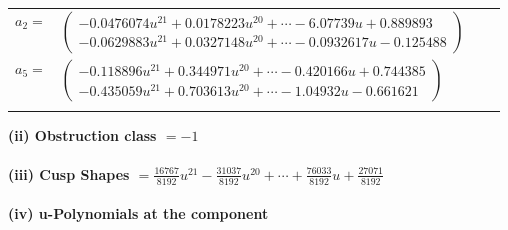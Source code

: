 \documentclass[1p]{elsarticle_modified}
\theoremstyle{definition}
\begin{document}
\begin{tabular}{m{7pt} m{180pt} m{7pt} m{180pt} }
\flushright $a_{2}=$&$\begin{pmatrix}-0.0476074 u^{21}+0.0178223 u^{20}+\cdots-6.07739 u+0.889893\\-0.0629883 u^{21}+0.0327148 u^{20}+\cdots-0.0932617 u-0.125488\end{pmatrix}$ \\
\flushright $a_{5}=$&$\begin{pmatrix}-0.118896 u^{21}+0.344971 u^{20}+\cdots-0.420166 u+0.744385\\-0.435059 u^{21}+0.703613 u^{20}+\cdots-1.04932 u-0.661621\end{pmatrix}$\\&\end{tabular}
\flushleft \textbf{(ii) Obstruction class $= -1$}\\~\\
\flushleft \textbf{(iii) Cusp Shapes $= \frac{16767}{8192} u^{21}-\frac{31037}{8192} u^{20}+\cdots+\frac{76033}{8192} u+\frac{27071}{8192}$}\\~\\
\newpage\renewcommand{\arraystretch}{1}
\flushleft \textbf{(iv) u-Polynomials at the component}\newline \\
\end{document}
